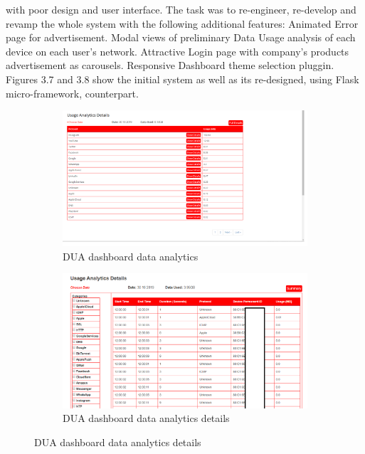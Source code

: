 \begin{itemize}
 with poor design and user interface. The task was to re-engineer, re-develop and revamp the whole system with the following additional features:
	\subitem Animated Error page for advertisement.
	\subitem Modal views of preliminary Data Usage analysis of each device on each user's network.
	\subitem Attractive Login page with company's products advertisement as carousels.
	\subitem Responsive Dashboard theme selection pluggin.\\
	
	
	 Figures 3.7 and 3.8 show the initial system as well as its re-designed, using Flask micro-framework, counterpart.
		\begin{figure}[!htbp]
		\centering
		\begin{subfigure}[b]{0.45\textwidth}
			\centering
			\includegraphics[width=\linewidth]{./duaformeranalytic}
			\caption{DUA dashboard data analytics}
		\end{subfigure}
		\hfill
		\begin{subfigure}[b]{0.45\textwidth}
			\centering
			\includegraphics[width=\linewidth]{./duaformeranalyticdetail}
			\caption{DUA dashboard data analytics details}
		\end{subfigure}

\end{figure}
\end{itemize}
